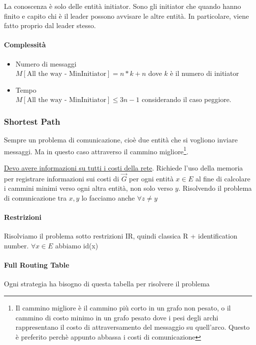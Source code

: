 La conoscenza è solo delle entità initiator. Sono gli initiator che quando hanno finito e capito chi è il leader possono avvisare le altre entità. In particolare, viene fatto proprio dal leader stesso.

\paragraph{Complessità}
\begin{itemize}
    \item Numero di messaggi\\
    $M[\text{All the way - MinInitiator}] = n * k + n$ dove $k$ è il numero di initiator
    \item Tempo\\
    $M[\text{All the way - MinInitiator}] \leq 3n - 1$ considerando il caso peggiore. 
\end{itemize}

\subsubsection{Shortest Path}
Sempre un problema di comunicazione, cioè due entità che si vogliono inviare messaggi. Ma in questo caso attraverso il cammino migliore\footnote{Il cammino migliore è il cammino più corto in un grafo non pesato, o il cammino di costo minimo in un grafo pesato dove i pesi degli archi rappresentano il costo di attraversamento del messaggio su quell'arco. Questo è preferito perchè appunto abbassa i costi di comunicazione}.

\uline{Devo avere informazioni su tutti i costi della rete}. Richiede l'uso della memoria per registrare informazioni sui costi di $\vec{G}$ per ogni entità $x \in E$ al fine di calcolare i cammini minimi verso ogni altra entità, non solo verso $y$. Risolvendo il problema di comunicazione tra $x,y$ lo facciamo anche $\forall z \neq y$

\paragraph{Restrizioni}
Risolviamo il problema sotto restrizioni IR, quindi classica R + identification number. $\forall x \in E$ abbiamo id(x)

\paragraph{Full Routing Table}
Ogni strategia ha bisogno di questa tabella per risolvere il problema


